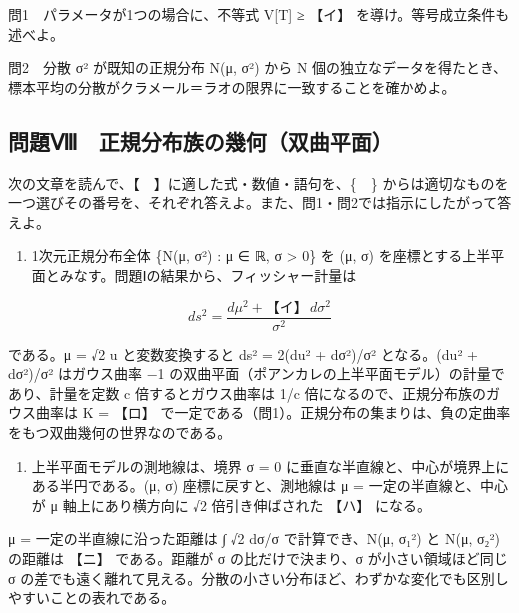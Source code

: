 \documentclass[
  10pt,
  a4paper,
]{article}
\providecommand{\tightlist}{%
  \setlength{\itemsep}{0pt}\setlength{\parskip}{0pt}}
\begin{document}
問1　パラメータが1つの場合に、不等式 V{[}T{]} ≥ 【イ】
を導け。等号成立条件も述べよ。

問2　分散 σ² が既知の正規分布 N(μ, σ²) から N
個の独立なデータを得たとき、標本平均の分散がクラメール＝ラオの限界に一致することを確かめよ。

\hypertarget{ux554fux984cux2177-ux6b63ux898fux5206ux5e03ux65cfux306eux5e7eux4f55ux53ccux66f2ux5e73ux9762}{%
\subsection{問題Ⅷ　正規分布族の幾何（双曲平面）}\label{ux554fux984cux2177-ux6b63ux898fux5206ux5e03ux65cfux306eux5e7eux4f55ux53ccux66f2ux5e73ux9762}}

次の文章を読んで、【　】に適した式・数値・語句を、\{　\}
からは適切なものを一つ選びその番号を、それぞれ答えよ。また、問1・問2では指示にしたがって答えよ。

\begin{enumerate}
\def\labelenumi{(\arabic{enumi})}
\tightlist
\item
  1次元正規分布全体 \{N(μ, σ²) : μ ∈ {\fallbackfont ℝ}, σ \textgreater{}
  0\} を (μ, σ)
  を座標とする上半平面とみなす。問題Ⅰの結果から、フィッシャー計量は
\end{enumerate}

\[ds^2 = \frac{d\mu^2 + \text{【イ】}\, d\sigma^2}{\sigma^2}\]

である。μ = √2 u と変数変換すると ds² = 2(du² + dσ²)/σ² となる。(du² +
dσ²)/σ² はガウス曲率 −1
の双曲平面（ポアンカレの上半平面モデル）の計量であり、計量を定数 c
倍するとガウス曲率は 1/c 倍になるので、正規分布族のガウス曲率は K =
【ロ】
で一定である（問1）。正規分布の集まりは、負の定曲率をもつ双曲幾何の世界なのである。

\begin{enumerate}
\def\labelenumi{(\arabic{enumi})}
\setcounter{enumi}{1}
\tightlist
\item
  上半平面モデルの測地線は、境界 σ = 0
  に垂直な半直線と、中心が境界上にある半円である。(μ, σ)
  座標に戻すと、測地線は μ = 一定の半直線と、中心が μ 軸上にあり横方向に
  √2 倍引き伸ばされた 【ハ】 になる。
\end{enumerate}

μ = 一定の半直線に沿った距離は ∫ √2 dσ/σ で計算でき、N(μ,
σ{\fallbackfont ₁}²) と N(μ, σ{\fallbackfont ₂}²) の距離は 【ニ】
である。距離が σ の比だけで決まり、σ が小さい領域ほど同じ σ
の差でも遠く離れて見える。分散の小さい分布ほど、わずかな変化でも区別しやすいことの表れである。
\end{document}
